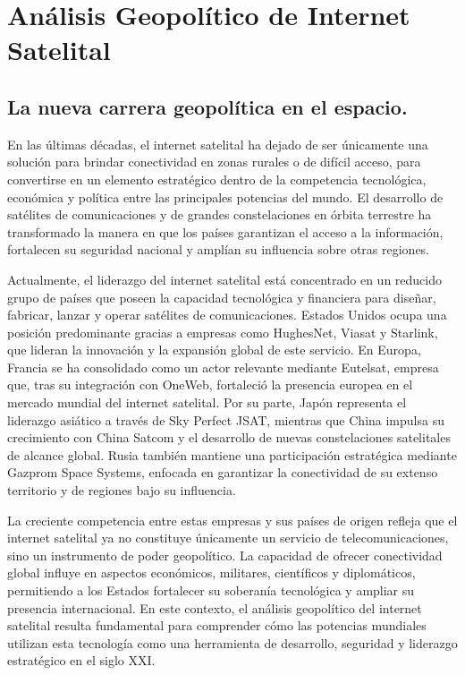 
\section{Análisis Geopolítico de Internet Satelital}
\subsection{La nueva carrera geopolítica en el espacio.}

En las últimas décadas, el internet satelital ha dejado de ser únicamente una solución para brindar conectividad en zonas rurales o de difícil acceso, para convertirse en un elemento estratégico dentro de la competencia tecnológica, económica y política entre las principales potencias del mundo. El desarrollo de satélites de comunicaciones y de grandes constelaciones en órbita terrestre ha transformado la manera en que los países garantizan el acceso a la información, fortalecen su seguridad nacional y amplían su influencia sobre otras regiones.

Actualmente, el liderazgo del internet satelital está concentrado en un reducido grupo de países que poseen la capacidad tecnológica y financiera para diseñar, fabricar, lanzar y operar satélites de comunicaciones. Estados Unidos ocupa una posición predominante gracias a empresas como HughesNet, Viasat y Starlink, que lideran la innovación y la expansión global de este servicio. En Europa, Francia se ha consolidado como un actor relevante mediante Eutelsat, empresa que, tras su integración con OneWeb, fortaleció la presencia europea en el mercado mundial del internet satelital. Por su parte, Japón representa el liderazgo asiático a través de Sky Perfect JSAT, mientras que China impulsa su crecimiento con China Satcom y el desarrollo de nuevas constelaciones satelitales de alcance global. Rusia también mantiene una participación estratégica mediante Gazprom Space Systems, enfocada en garantizar la conectividad de su extenso territorio y de regiones bajo su influencia.

La creciente competencia entre estas empresas y sus países de origen refleja que el internet satelital ya no constituye únicamente un servicio de telecomunicaciones, sino un instrumento de poder geopolítico. La capacidad de ofrecer conectividad global influye en aspectos económicos, militares, científicos y diplomáticos, permitiendo a los Estados fortalecer su soberanía tecnológica y ampliar su presencia internacional. En este contexto, el análisis geopolítico del internet satelital resulta fundamental para comprender cómo las potencias mundiales utilizan esta tecnología como una herramienta de desarrollo, seguridad y liderazgo estratégico en el siglo XXI.

